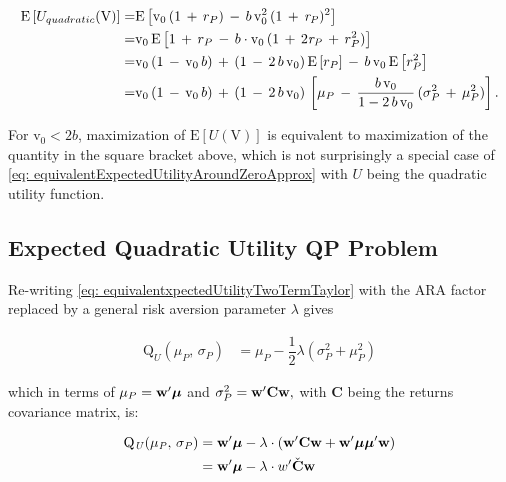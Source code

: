 \documentclass[graybox,envcountchap,sectrefs]{svmono}\usepackage[]{graphicx}\usepackage[]{xcolor}
\begin{document}
\begin{appendices}
\begin{align}
\mathrm{E}\left[U_{quadratic}(\mathrm{V})\right]= & \mathrm{E}\left[\mathrm{v}_{0}\,(1\,+\,\mbox{\ensuremath{r_{P}}})\,-\,b\,\mathrm{v}_{0}^{2}\,(1\,+\,\mathit{r_{P}})^{2}\right]\nonumber \\
= & \mathrm{v}_{0}\,\mathrm{E}\left[1\,+\,\mbox{\ensuremath{r_{P}}}\,-\,b\cdot\mathrm{v}_{0}\,(1\,+\,2\mathit{r_{P}}\,+\,r_{P}^{2})\right]\nonumber \\
= & \mathrm{v}_{0}\,(1\,-\,\mathrm{v}_{0}\,b)\,+\,(1\,-\,2\,b\,\mathrm{v}_{0})\,\mathrm{E}\left[r_{P}\right]\,-\,b\,\mathrm{v}_{0}\,\mathrm{E}\left[r_{P}^{2}\right]\nonumber \\
= & \mathrm{v}_{0}\,(1\,-\,\mathrm{v}_{0}\,b)\,+\,(1\,-\,2\,b\,\mathrm{v}_{0})\,\left[\mu_{P}\,-\,\dfrac{b\,\mathrm{v}_{0}}{1-2\,b\,\mathrm{v}_{0}}\,(\sigma_{P}^{2}\,+\,\mu_{P}^{2})\right].\label{eq: expectedQuadraticUtility}
\end{align}

For $\mathrm{v}_{0}<2b$, maximization of $\mathrm{E}\left[U(\mathrm{V})\right]$
is equivalent to maximization of the quantity in the square bracket
above, which is not surprisingly a special case of \eqref{eq: equivalentExpectedUtilityAroundZeroApprox}
with $U$ being the quadratic utility function.

\subsection*{Expected Quadratic Utility QP Problem}

Re-writing \eqref{eq: equivalentxpectedUtilityTwoTermTaylor} with
the ARA factor replaced by a general risk aversion parameter $\lambda$
gives

\begin{align}
\mathrm{Q}_{U}(\mu_{P},\,\sigma_{P}) & =\mu_{P}-\dfrac{1}{2}\lambda\left(\sigma_{P}^{2}+\mu_{P}^{2}\right)
\end{align}

which in terms of $\mu_{P}={\bf w'\boldsymbol{\mu}}$ and $\sigma_{P}^{2}={\bf w'}\mathbf{C}{\bf w},$
with $\mathbf{C}$ being the returns covariance matrix, is:

\begin{align*}
\mathrm{\mathrm{Q}_{\mathit{U}}(\mu_{\mathit{P}},\,\sigma_{\mathit{P}})} & ={\bf w^{\prime}\boldsymbol{\mu}}-\lambda\cdot(\mathbf{w}^{\prime}\mathbf{C}{\bf w+w^{\prime}\boldsymbol{\mu\mu}'{\bf w)}}\\
 & ={\bf w^{\prime}\boldsymbol{\mu}}-\lambda\cdot w^{\prime}\check{\mathbf{C}}\mathbf{w}
\end{align*}


\end{appendices}
\end{document}
